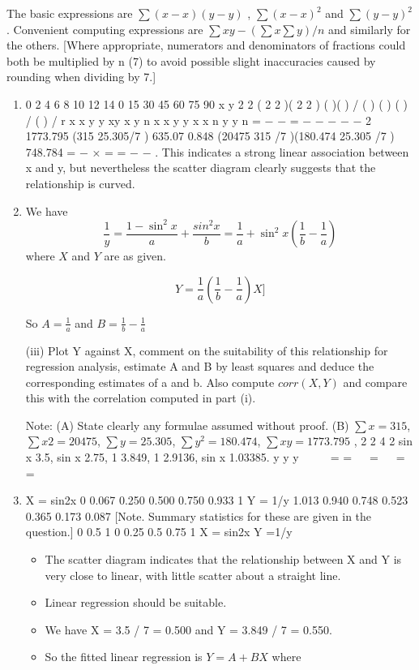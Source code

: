 \documentclass[a4paper,12pt]{article}
\begin{document}
The basic expressions are $\sum(x − x)( y − y)$ , $\sum(x − x)^2$ and $\sum( y − y)^2$ . Convenient
computing expressions are $\sum xy − (\sum x\sum y) / n$ and similarly for the others. [Where
appropriate, numerators and denominators of fractions could both be multiplied by n
(7) to avoid possible slight inaccuracies caused by rounding when dividing by 7.]
\begin{enumerate}
\item 
0
2
4
6
8
10
12
14
0 15 30 45 60 75 90
x
y
2 2 ( 2 2 )( 2 2 )
( )( ) /
( ) ( ) ( ) / ( ) /
r x x y y xy x y n
x x y y x x n y y n
= \sum − − = \sum − \sum \sum
\sum − \sum − \sum − \sum \sum −  2
1773.795 (315 25.305/7 ) 635.07 0.848
(20475 315 /7 )(180.474 25.305 /7 ) 748.784
= − × = =
− −
.
This indicates a strong linear association between x and y, but nevertheless the scatter
diagram clearly suggests that the relationship is curved.
\item 
We have \[ \frac{1}{y} = \frac{1-\sin^2x}{a} + \frac{sin^2x}{b}
= \frac{1}{a} + \sin^2x \left(\frac{1}{b} - \frac{1}{a} \right) \]
where $X$ and $Y$ are as given.

\[Y = \frac{1}{a} \left(\frac{1}{b} - \frac{1}{a} \right) X]\]

So $A = \frac{1}{a}$   and $B = \frac{1}{b} - \frac{1}{a}$

\newpage

\begin{framed}
(iii) Plot Y against X, comment on the suitability of this relationship for regression
analysis, estimate A and B by least squares and deduce the corresponding
estimates of a and b. Also compute $corr(X, Y)$ and compare this with the
correlation computed in part (i).

Note: (A) State clearly any formulae assumed without proof.
(B) $\sum x = 315$, $\sum x2 = 20475$, $\sum y = 25.305$, $\sum y^2 =180.474$, $\sum xy =1773.795$ ,
2
2 4
2
sin x 3.5, sin x 2.75, 1 3.849, 1 2.9136, sin x 1.03385.
y y y
   
= =   =   = =
   
\sum \sum \sum \sum \sum
\end{framed}
\item 
X = sin2x 0 0.067 0.250 0.500 0.750 0.933 1
Y = 1/y 1.013 0.940 0.748 0.523 0.365 0.173 0.087
[Note. Summary statistics for these are given in the question.]
0
0.5
1
0 0.25 0.5 0.75 1
X = sin2x
Y
=1/y
\begin{itemize}
\item 
The scatter diagram indicates that the relationship between X and Y is very close to
linear, with little scatter about a straight line. 
\item Linear regression should be suitable.
\item  We have X = 3.5 / 7 = 0.500 and Y = 3.849 / 7 = 0.550.
\item  So the fitted linear regression is $Y = A + BX$ where


\end{itemize}
\end{enumerate}
\end{document}
